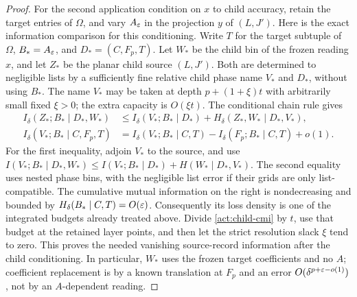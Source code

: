 \begin{proof}
For the second application condition on $x$ to child accuracy, retain
the target entries of $\Omega$, and vary $A_\varepsilon$ in the projection
$y$ of $(L,J')$.  Here is the exact information comparison for this
conditioning.  Write $T$ for the target subtuple of $\Omega$,
$B_*=A_\varepsilon$, and $D_*=(C,F_p,T)$.  Let $W_*$ be the child bin
of the frozen reading $x$, and let $Z_*$ be the planar child
source $(L,J')$.  Both are determined to negligible lists by a
sufficiently fine relative child phase name $V_*$ and $D_*$,
without using $B_*$.  The name $V_*$ may be taken at depth
$p+(1+\xi)t$ with arbitrarily small fixed $\xi>0$; the extra
capacity is $O(\xi t)$.  The conditional chain rule gives
\begin{align}
 I_\delta(Z_*;B_*\mid D_*,W_*)
 &\le I_\delta(V_*;B_*\mid D_*)
       +H_\delta(Z_*,W_*\mid D_*,V_*),
       \label{act:child-cmi}\\
 I_\delta(V_*;B_*\mid C,F_p,T)
 &= I_\delta(V_*;B_*\mid C,T)
       -I_\delta(F_p;B_*\mid C,T)+o(1).
       \label{act:child-budget}
\end{align}
For the first inequality, adjoin $V_*$ to the source, and use
$I(V_*;B_*\mid D_*,W_*)
\le I(V_*;B_*\mid D_*)+H(W_*\mid D_*,V_*)$.
The second equality uses nested phase bins, with the negligible
list error if their grids are only list-compatible.  The
cumulative mutual information on the right is nondecreasing
and bounded by $H_\delta(B_*\mid C,T)=O(\varepsilon)$.
Consequently its loss density is one of the integrated budgets
already treated above.  Divide \eqref{act:child-cmi} by $t$,
use that budget at the retained layer points, and then let the
strict resolution slack $\xi$ tend to zero.  This proves the
needed vanishing source-record information after the child
conditioning.  In particular, $W_*$ uses the frozen target
coefficients and no $A$; coefficient replacement is by a known
translation at $F_p$ and an error
$O(\delta^{p+\varepsilon-o(1)})$, not by an $A$-dependent reading.


\end{proof}
